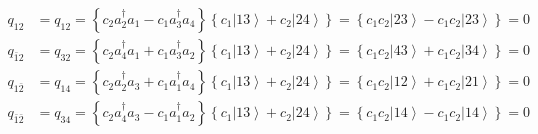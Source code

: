 \documentclass[aps,preprint]{revtex4}%
\begin{document}
\begin{align*}
q_{12}  & =q_{12}=\left\{  c_{2}a_{2}^{\dagger}a_{1}-c_{1}a_{3}^{\dagger}%
a_{4}\right\}  \left\{  c_{1}\left\vert 13\right\rangle +c_{2}\left\vert
24\right\rangle \right\}  =\left\{  c_{1}c_{2}\left\vert 23\right\rangle
-c_{1}c_{2}\left\vert 23\right\rangle \right\}  =0\\
q_{\bar{1}2}  & =q_{32}=\left\{  c_{2}a_{4}^{\dagger}a_{1}+c_{1}a_{3}%
^{\dagger}a_{2}\right\}  \left\{  c_{1}\left\vert 13\right\rangle
+c_{2}\left\vert 24\right\rangle \right\}  =\left\{  c_{1}c_{2}\left\vert
43\right\rangle +c_{1}c_{2}\left\vert 34\right\rangle \right\}  =0\\
q_{1\bar{2}}  & =q_{14}=\left\{  c_{2}a_{2}^{\dagger}a_{3}+c_{1}a_{1}%
^{\dagger}a_{4}\right\}  \left\{  c_{1}\left\vert 13\right\rangle
+c_{2}\left\vert 24\right\rangle \right\}  =\left\{  c_{1}c_{2}\left\vert
12\right\rangle +c_{1}c_{2}\left\vert 21\right\rangle \right\}  =0\\
q_{\bar{1}\bar{2}}  & =q_{34}=\left\{  c_{2}a_{4}^{\dagger}a_{3}-c_{1}%
a_{1}^{\dagger}a_{2}\right\}  \left\{  c_{1}\left\vert 13\right\rangle
+c_{2}\left\vert 24\right\rangle \right\}  =\left\{  c_{1}c_{2}\left\vert
14\right\rangle -c_{1}c_{2}\left\vert 14\right\rangle \right\}  =0
\end{align*}
\end{document}

